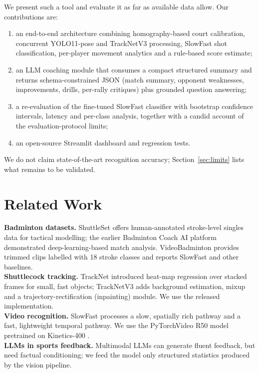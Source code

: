 \documentclass[10pt,journal]{IEEEtran}
\begin{document}
We present such a tool and evaluate it as far as available data allow. Our contributions are:
\begin{enumerate}
\item an end-to-end architecture combining homography-based court calibration, concurrent YOLO11-pose and TrackNetV3 processing, SlowFast shot classification, per-player movement analytics and a rule-based score estimate;
\item an LLM coaching module that consumes a compact structured summary and returns schema-constrained JSON (match summary, opponent weaknesses, improvements, drills, per-rally critiques) plus grounded question answering;
\item a re-evaluation of the fine-tuned SlowFast classifier with bootstrap confidence intervals, latency and per-class analysis, together with a candid account of the evaluation-protocol limits;
\item an open-source Streamlit dashboard and regression tests.
\end{enumerate}
We do not claim state-of-the-art recognition accuracy; Section~\ref{sec:limits} lists what remains to be validated.

\section{Related Work}
\textbf{Badminton datasets.} ShuttleSet \cite{wang2023shuttleset} offers human-annotated stroke-level singles data for tactical modelling; the earlier Badminton Coach AI platform \cite{wang2020badminton} demonstrated deep-learning-based match analysis. VideoBadminton \cite{li2024videobadminton} provides trimmed clips labelled with 18 stroke classes and reports SlowFast and other baselines.\\
\textbf{Shuttlecock tracking.} TrackNet \cite{huang2019tracknet} introduced heat-map regression over stacked frames for small, fast objects; TrackNetV3 \cite{chen2023tracknetv3} adds background estimation, mixup and a trajectory-rectification (inpainting) module. We use the released implementation.\\
\textbf{Video recognition.} SlowFast \cite{feichtenhofer2019slowfast} processes a slow, spatially rich pathway and a fast, lightweight temporal pathway. We use the PyTorchVideo \cite{fan2021pytorchvideo} R50 model pretrained on Kinetics-400 \cite{kay2017kinetics}.\\
\textbf{LLMs in sports feedback.} Multimodal LLMs \cite{gemini2023} can generate fluent feedback, but need factual conditioning; we feed the model only structured statistics produced by the vision pipeline.
\end{document}
